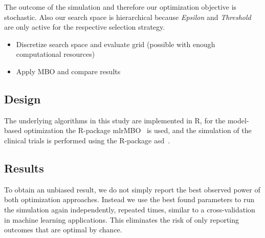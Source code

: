 \documentclass[bimj,fleqn]{w-art}
\theoremstyle{plain}
\theoremstyle{definition}
\begin{document}


The outcome of the simulation and therefore our optimization objective is stochastic.
Also our search space is hierarchical because \emph{Epsilon} and \emph{Threshold} are only active for the respective selection strategy.





\begin{itemize}
  \item Discretize search space and evaluate grid (possible with enough computational resources)
  \item Apply MBO and compare results
\end{itemize}



\subsection{Design}

The underlying algorithms in this study are implemented in R, for the model-based optimization the R-package mlrMBO~\citep{bischl_mlrmbo_2017} is used, and the simulation of the clinical trials is performed using the R-package asd~\citep{parsons_software_2011}.


\subsection{Results}

To obtain an unbiased result, we do not simply report the best observed power of both optimization approaches.
Instead we use the best found parameters to run the simulation again independently, repeated times, similar to a cross-validation in machine learning applications.
This eliminates the risk of only reporting outcomes that are optimal by chance.
\end{document}
